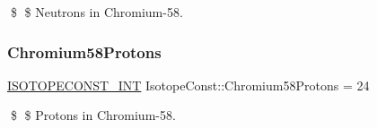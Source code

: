 \$ \$ Neutrons in Chromium-\/58. \mbox{\label{group___isotope_const-_chromium-_cr58_ga7f9344b13388b66575be69b814211dd7}} 
\subsubsection{\texorpdfstring{Chromium58\+Protons}{Chromium58Protons}}
{\footnotesize\ttfamily \mbox{\hyperlink{group___isotope_const-_macros_ga5f18360b3e99483a35c32d789e62621c}{I\+S\+O\+T\+O\+P\+E\+C\+O\+N\+S\+T\+\_\+\+I\+NT}} Isotope\+Const\+::\+Chromium58\+Protons = 24}

\$ \$ Protons in Chromium-\/58. 